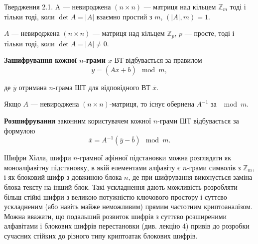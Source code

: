 \begin{claim}
    Твердження 2.1.
    A --- невироджена $(n \times n)$ --- матриця над кільцем $\mathbb{Z}_m$ тоді і
    тільки тоді, коли $\det A = |A|$ взаємно простий з $m$, $(|A|, m) = 1$.
\end{claim}

\begin{claim}
    $A$ --- невироджена $(n \times n)$ --- матриця над кільцем $\mathbb{Z}_p$, $p$ ---
    просте, тоді і тільки тоді, коли $\det A = |A| \neq 0$.
\end{claim}

\textbf{Зашифрування кожної $n$-грами $\overline{x}$} ВТ відбувається за правилом
$$\overline{y} = (A \overline{x} + \overline{b}) \mod m,$$

де $\overline{y}$ отримана $n$-грама ШТ для відповідного ВТ $\overline{x}$.

Якщо $A$ --- невироджена $(n \times n)$-матриця, то існує обернена $A^{-1}$
за $\mod m$.

\textbf{Розшифрування} законним користувачем кожної $n$-грами ШТ
відбувається за формулою
$$\overline{x} = A^{-1}(\overline{y} - \overline{b}) \mod m.$$

\begin{remark}
    Шифри Хілла, шифри $n$-грамної афінної підстановки
    можна розглядати як моноалфавітну підстановку, в якій елементами алфавіту
    є $n$-грами символів з $\mathbb{Z}_m$, і як блоковий шифр з довжиною блока $n$, де при
    шифрування виконується заміна блока тексту на інший блок. Такі
    ускладнення дають можливість розробляти більш стійкі шифри з великою
    потужністю ключового простору і суттєво ускладненим (або навіть майже
    неможливим) прямим частотним криптоаналізом. Можна вважати, що
    подальший розвиток шифрів з суттєво розширеними алфавітами і блокових
    шифрів перестановки (див. лекцію 4) привів до розробки сучасних стійких до
    різного типу криптоатак блокових шифрів.
\end{remark}

